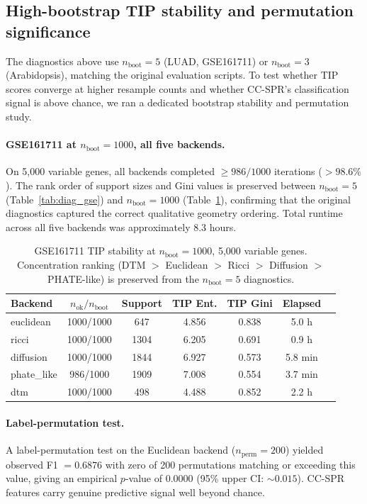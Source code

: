 \documentclass[12pt]{article}
\begin{document}
\subsection{High-bootstrap TIP stability and permutation significance}
\label{sec:highboot}

The diagnostics above use $n_{\text{boot}} = 5$ (LUAD, GSE161711) or $n_{\text{boot}} = 3$ (Arabidopsis), matching the original evaluation scripts.
To test whether TIP scores converge at higher resample counts and whether CC-SPR's classification signal is above chance, we ran a dedicated bootstrap stability and permutation study.

\paragraph{GSE161711 at $n_{\text{boot}} = 1000$, all five backends.}
On 5{,}000 variable genes, all backends completed $\geq 986/1000$ iterations ($> 98.6\%$).
The rank order of support sizes and Gini values is preserved between $n_{\text{boot}} = 5$ (Table~\ref{tab:diag_gse}) and $n_{\text{boot}} = 1000$ (Table~\ref{tab:gse_boot1000}), confirming that the original diagnostics captured the correct qualitative geometry ordering.
Total runtime across all five backends was approximately 8.3 hours.

\begin{table}[h]
\centering\small
\begin{tabular}{@{}lcccccc@{}}
\toprule
Backend & $n_{\text{ok}}/n_{\text{boot}}$ & Support & TIP Ent. & TIP Gini & Elapsed \\
\midrule
euclidean  & 1000/1000 & 647  & 4.856 & 0.838 & 5.0 h \\
ricci      & 1000/1000 & 1304 & 6.205 & 0.691 & 0.9 h \\
diffusion  & 1000/1000 & 1844 & 6.927 & 0.573 & 5.8 min \\
phate\_like & 986/1000 & 1909 & 7.008 & 0.554 & 3.7 min \\
dtm        & 1000/1000 & 498  & 4.488 & 0.852 & 2.2 h \\
\bottomrule
\end{tabular}
\caption{GSE161711 TIP stability at $n_{\text{boot}} = 1000$, 5{,}000 variable genes. Concentration ranking (DTM $>$ Euclidean $>$ Ricci $>$ Diffusion $>$ PHATE-like) is preserved from the $n_{\text{boot}} = 5$ diagnostics.}
\label{tab:gse_boot1000}
\end{table}

\paragraph{Label-permutation test.}
A label-permutation test on the Euclidean backend ($n_{\text{perm}} = 200$) yielded observed F1 $= 0.6876$ with zero of 200 permutations matching or exceeding this value, giving an empirical $p$-value of $0.0000$ (95\% upper CI: $\sim 0.015$).
CC-SPR features carry genuine predictive signal well beyond chance.
\end{document}
